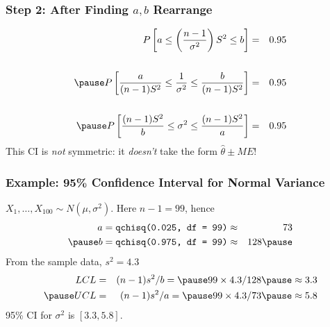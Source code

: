 \documentclass[handout]{beamer}
\begin{document}
\begin{frame}
\frametitle{Step 2: After Finding $a,b$ Rearrange}
 	\begin{eqnarray*}
 		P\left[ a\leq   \left( \frac{n-1}{\sigma^2}\right)S^2 \leq b \right] &=& 0.95 \\ \\ \pause
 		P\left[ \frac{a}{(n-1)S^2}\leq  \frac{1}{\sigma^2} \leq \frac{b}{(n-1)S^2} \right] &=& 0.95 \\ \\ \pause
 				P\left[ \frac{(n-1)S^2}{b}\leq  \sigma^2 \leq \frac{(n-1)S^2}{a} \right] &=& 0.95
 	\end{eqnarray*}	
 	\pause
\alert{This CI is \emph{not} symmetric: it \emph{doesn't} take the form $\widehat{\theta} \pm ME$!}
\end{frame}
\begin{frame}
\frametitle{Example: 95\% Confidence Interval for Normal Variance}
$X_1, \hdots, X_{100} \sim N(\mu,\sigma^2)$. Here $n-1 = 99$, hence \pause
	\begin{eqnarray*}
		a = \texttt{qchisq(0.025, df = 99)} &\approx& 73\\ \pause
		b = \texttt{qchisq(0.975, df = 99)} &\approx& 128 \pause
	\end{eqnarray*}	
From the sample data, $s^2 = 4.3$
	\begin{eqnarray*}
		LCL &=& (n-1)s^2/b = \pause 99 \times 4.3/128 \pause \approx 3.3\\ \pause
		UCL &=& (n-1)s^2/a = \pause 99 \times 4.3/73 \pause \approx  5.8
	\end{eqnarray*}
	\pause
	\alert{95\% CI for $\sigma^2$ is $[3.3, 5.8]$.}%
\end{frame}
\end{document}
